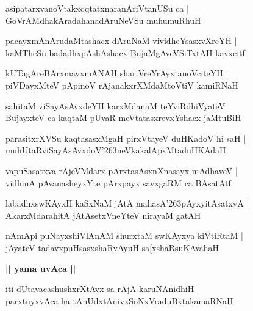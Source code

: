 \documentclass[twoside,12pt,openright]{book}
\def\S{\char'263}
\newcounter{shloka}[chapter]
\def\uvaca#1{\centerline{{\large\textbf{#1}}}}
\begin{document}
\begin{shloka}%
asipatarxvanoVtakxqqtatxnaranAriVtanUSu ca |\\
GoVrAMdhakAradahanadAruNeVSu muhumuRhuH
\end{shloka}

\begin{shloka}%
pacayxmAnArudaMtashacx dAruNaM vividheYsasxvXreYH |\\
kaMTheSu badadhxpAshAshacx BujaMgAveVSiTxtAH kavxcitf
\end{shloka}

\begin{shloka}%
kUTagAreBArxmayxmANAH shariVreYrAyxtanoVciteYH |\\
piVDayxMteV pApinoV rAjanakxrXMdaMtoVtiV kamiRNaH 
\end{shloka}

\begin{shloka}%
sahitaM viSayAsAvxdeYH karxMdanaM teYviRdhiVyateV |\\
BujayxteV ca kaqtaM pUvaR meVtatasxrevxYshacx jaMtuBiH
\end{shloka}

\begin{shloka}%
parasitxrXVSu kaqtasasxMgaH pirxVtayeV duHKadoV hi saH |\\
muhUtaRviSayAsAvxdoV\S neVkakalApxMtaduHKAdaH 
\end{shloka}

\begin{shloka}%
vapuSasatxva rAjeVMdarx pArxtasAsxnXnasayx mAdhaveV |\\
vidhinA pAvanasheyxYte pArxpayx savxgaRM ca BAsatAtf
\end{shloka}

\begin{shloka}%
labadhxswKAyxH kaSxNaM jAtA mahasA\S pAyxyitAsatxvA |\\
AkarxMdarahitA jAtAsetxVneYteV nirayaM gatAH 
\end{shloka}

\begin{shloka}%
nAmApi puNayxshiVlAnAM shurxtaM swKAyxya kiVtiRtaM |\\
jAyateV tadavxpuHsasxshaRvAyuH sa[xshaRsuKAvahaH
\end{shloka}

\uvaca{|| yama uvAca ||}

\begin{shloka}%
iti dUtavacashushxrXtAvx sa rAjA karuNAnidhiH |\\
parxtuyxvAca ha tAnUdxtAnivxSoNxVraduBxtakamaRNaH 
\end{shloka}
\end{document}
